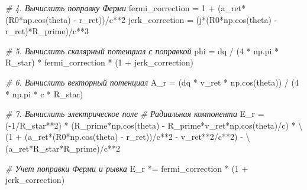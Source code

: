 \documentclass[11pt]{article}
\newenvironment{Shaded}{}{}
\newcommand{\DecValTok}[1]{\textcolor[rgb]{0.25,0.63,0.44}{{#1}}}
\newcommand{\CommentTok}[1]{\textcolor[rgb]{0.38,0.63,0.69}{\textit{{#1}}}}
\newcommand{\NormalTok}[1]{{#1}}
\newcommand{\OperatorTok}[1]{\textcolor[rgb]{0.40,0.40,0.40}{{#1}}}
\begin{document}
\begin{Shaded}
\begin{Highlighting}[]
        \CommentTok{# 4. Вычислить поправку Ферми}
\NormalTok{        fermi_correction }\OperatorTok{=} \DecValTok{1} \OperatorTok{+}\NormalTok{ (a_ret}\OperatorTok{*}\NormalTok{(R0}\OperatorTok{*}\NormalTok{np.cos(theta) }\OperatorTok{-}\NormalTok{ r_ret))}\OperatorTok{/}\NormalTok{c}\OperatorTok{**}\DecValTok{2}
\NormalTok{        jerk_correction }\OperatorTok{=}\NormalTok{ (j}\OperatorTok{*}\NormalTok{(R0}\OperatorTok{*}\NormalTok{np.cos(theta) }\OperatorTok{-}\NormalTok{ r_ret)}\OperatorTok{*}\NormalTok{R_prime)}\OperatorTok{/}\NormalTok{c}\OperatorTok{**}\DecValTok{3}

        \CommentTok{# 5. Вычислить скалярный потенциал с поправкой}
\NormalTok{        phi }\OperatorTok{=}\NormalTok{ dq }\OperatorTok{/}\NormalTok{ (}\DecValTok{4} \OperatorTok{*}\NormalTok{ np.pi }\OperatorTok{*}\NormalTok{ R_star) }\OperatorTok{*}\NormalTok{ fermi_correction }\OperatorTok{*}\NormalTok{ (}\DecValTok{1} \OperatorTok{+}\NormalTok{ jerk_correction)}

        \CommentTok{# 6. Вычислить векторный потенциал}
\NormalTok{        A_r }\OperatorTok{=}\NormalTok{ (dq }\OperatorTok{*}\NormalTok{ v_ret }\OperatorTok{*}\NormalTok{ np.cos(theta)) }\OperatorTok{/}\NormalTok{ (}\DecValTok{4} \OperatorTok{*}\NormalTok{ np.pi }\OperatorTok{*}\NormalTok{ c }\OperatorTok{*}\NormalTok{ R_star)}

        \CommentTok{# 7. Вычислить электрическое поле}
        \CommentTok{# Радиальная компонента}
\NormalTok{        E_r }\OperatorTok{=}\NormalTok{ (}\OperatorTok{-}\DecValTok{1}\OperatorTok{/}\NormalTok{R_star}\OperatorTok{**}\DecValTok{2}\NormalTok{) }\OperatorTok{*}\NormalTok{ (R_prime}\OperatorTok{*}\NormalTok{np.cos(theta) }\OperatorTok{-}\NormalTok{ R_prime}\OperatorTok{*}\NormalTok{v_ret}\OperatorTok{*}\NormalTok{np.cos(theta)}\OperatorTok{/}\NormalTok{c) }\OperatorTok{*} \OperatorTok{\textbackslash{}}
\NormalTok{              (}\DecValTok{1} \OperatorTok{+}\NormalTok{ (a_ret}\OperatorTok{*}\NormalTok{(R0}\OperatorTok{*}\NormalTok{np.cos(theta) }\OperatorTok{-}\NormalTok{ r_ret))}\OperatorTok{/}\NormalTok{c}\OperatorTok{**}\DecValTok{2} \OperatorTok{-}\NormalTok{ v_ret}\OperatorTok{**}\DecValTok{2}\OperatorTok{/}\NormalTok{c}\OperatorTok{**}\DecValTok{2}\NormalTok{) }\OperatorTok{-} \OperatorTok{\textbackslash{}}
\NormalTok{              (a_ret}\OperatorTok{*}\NormalTok{R_star}\OperatorTok{*}\NormalTok{R_prime)}\OperatorTok{/}\NormalTok{c}\OperatorTok{**}\DecValTok{2}

        \CommentTok{# Учет поправки Ферми и рывка}
\NormalTok{        E_r }\OperatorTok{*=}\NormalTok{ fermi_correction }\OperatorTok{*}\NormalTok{ (}\DecValTok{1} \OperatorTok{+}\NormalTok{ jerk_correction)}


\end{Highlighting}
\end{Shaded}
\end{document}
